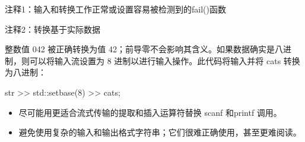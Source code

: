 {\footnotesize
注释1：输入和转换工作正常或设置容易被检测到的fail()函数

注释2：转换基于实际数据
}

整数值 042 被正确转换为值 42；前导零不会影响其含义。如果数据确实是八进制，则可以将输入流设置为 8 进制以进行输入操作。此代码将输入并将 cats 转换为八进制：

\begin{cpp}
str >> std::setbase(8) >> cats;
\end{cpp}


\begin{itemize}
\item
尽可能用更适合流式传输的提取和插入运算符替换 scanf 和printf 调用。

\item
避免使用复杂的输入和输出格式字符串；它们很难正确使用，甚至更难阅读。
\end{itemize}
